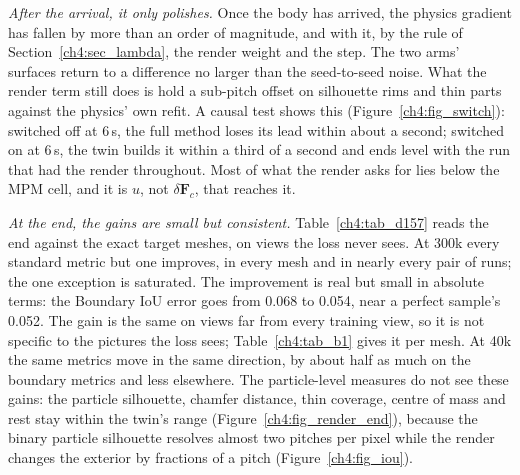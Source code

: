 \textit{After the arrival, it only polishes.} Once the body has arrived, the physics gradient has fallen by more than an
order of magnitude, and with it, by the rule of Section~\ref{ch4:sec_lambda}, the render weight and the step. The two arms'
surfaces return to a difference no larger than the seed-to-seed noise. What the render term still does is hold a sub-pitch
offset on silhouette rims and thin parts against the physics' own refit. A causal test shows this
(Figure~\ref{ch4:fig_switch}): switched off at 6\,s, the full method loses its lead within about a second; switched on at
6\,s, the twin builds it within a third of a second and ends level with the run that had the render throughout. Most of
what the render asks for lies below the MPM cell, and it is $u$, not $\delta\mathbf{F}_c$, that reaches it.

\textit{At the end, the gains are small but consistent.} Table~\ref{ch4:tab_d157} reads the end against the exact target
meshes, on views the loss never sees. At 300k every standard metric but one improves, in every mesh and in nearly every
pair of runs; the one exception is saturated. The improvement is real but small in absolute terms: the Boundary IoU error
goes from 0.068 to 0.054, near a perfect sample's 0.052. The gain is the same on views far from every training view, so it
is not specific to the pictures the loss sees; Table~\ref{ch4:tab_b1} gives it per mesh. At 40k the same metrics move in
the same direction, by about half as much on the boundary metrics and less elsewhere. The particle-level measures do not
see these gains: the particle silhouette, chamfer distance, thin coverage, centre of mass and rest stay within the twin's
range (Figure~\ref{ch4:fig_render_end}), because the binary particle silhouette resolves almost two pitches per pixel while
the render changes the exterior by fractions of a pitch (Figure~\ref{ch4:fig_iou}).


